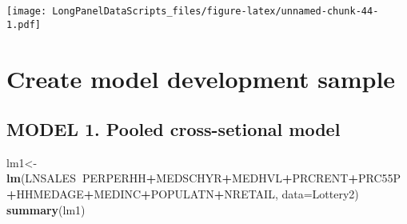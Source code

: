 \documentclass[]{book}
\newenvironment{Shaded}{\begin{snugshade}}{\end{snugshade}}
\newcommand{\DataTypeTok}[1]{\textcolor[rgb]{0.13,0.29,0.53}{#1}}
\newcommand{\DecValTok}[1]{\textcolor[rgb]{0.00,0.00,0.81}{#1}}
\newcommand{\KeywordTok}[1]{\textcolor[rgb]{0.13,0.29,0.53}{\textbf{#1}}}
\newcommand{\NormalTok}[1]{#1}
\newcommand{\OperatorTok}[1]{\textcolor[rgb]{0.81,0.36,0.00}{\textbf{#1}}}
\begin{document}
\texttt{[image: LongPanelDataScripts\_files/figure-latex/unnamed-chunk-44-1.pdf]}

\hypertarget{create-model-development-sample}{%
\section{Create model development sample}\label{create-model-development-sample}}

\begin{Shaded}
\end{Shaded}

\hypertarget{model-1.-pooled-cross-setional-model}{%
\subsection{MODEL 1. Pooled cross-setional model}\label{model-1.-pooled-cross-setional-model}}

\begin{Shaded}
\begin{Highlighting}[]
\NormalTok{lm1<-}\KeywordTok{lm}\NormalTok{(LNSALES}\OperatorTok{~}\NormalTok{PERPERHH}\OperatorTok{+}\NormalTok{MEDSCHYR}\OperatorTok{+}\NormalTok{MEDHVL}\OperatorTok{+}\NormalTok{PRCRENT}\OperatorTok{+}\NormalTok{PRC55P}\OperatorTok{+}\NormalTok{HHMEDAGE}\OperatorTok{+}\NormalTok{MEDINC}\OperatorTok{+}\NormalTok{POPULATN}\OperatorTok{+}\NormalTok{NRETAIL, }\DataTypeTok{data=}\NormalTok{Lottery2)}
\KeywordTok{summary}\NormalTok{(lm1)}
\end{Highlighting}
\end{Shaded}
\end{document}
